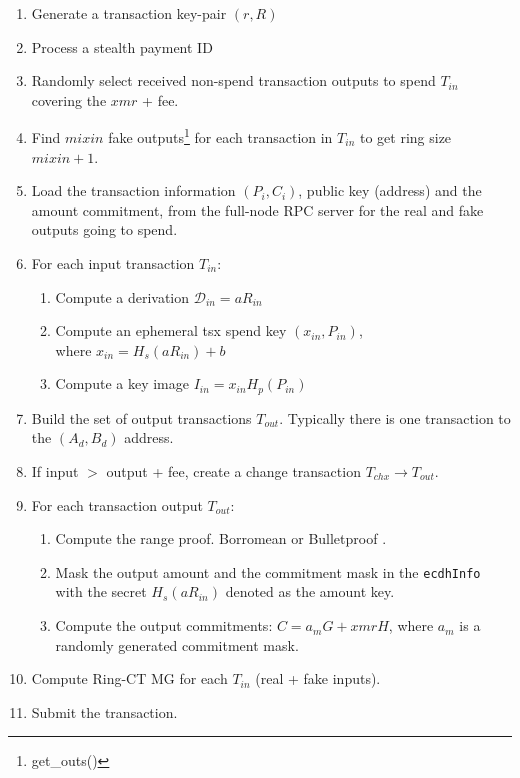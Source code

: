 \documentclass[]{article}
\begin{document}
\begin{enumerate}
	\item Generate a transaction key-pair $(r, R)$
	\item Process a stealth payment ID
	\item Randomly select received non-spend transaction outputs to spend $T_{in}$ covering the $xmr$ + fee.
	\item Find $mixin$ fake outputs\footnote{get\_outs()} for each transaction in $T_{in}$ to get ring size $mixin + 1$.
	\item Load the transaction information $(P_i, C_i)$, public key (address) and the amount commitment, from the full-node RPC server for the real and fake outputs going to spend.
	\item For each input transaction $T_{in}$:
	\begin{enumerate}
		\item Compute a derivation $\mathcal{D}_{in} = aR_{in}$
		\item Compute an ephemeral tsx spend key $(x_{in}, P_{in})$, \\where $x_{in} = H_s(aR_{in}) + b$
		\item Compute a key image $I_{in} = x_{in}H_p(P_{in})$
	\end{enumerate}
	\item Build the set of output transactions $T_{out}$. Typically there is one transaction to the $(A_d, B_d)$ address.
	\item If input $>$ output + fee, create a change transaction $T_{chx} \rightarrow T_{out}$. 
	\item For each transaction output $T_{out}$:
	\begin{enumerate}
		\item Compute the range proof. Borromean or Bulletproof \cite{monero_1098, borromean, Bnz2017BulletproofsSP}.
		\item Mask the output amount and the commitment mask in the \verb|ecdhInfo| with the secret $H_s(aR_{in})$ denoted as the amount key.
		\item Compute the output commitments: $C = a_mG + xmrH$, where $a_m$ is a randomly generated commitment mask.
	\end{enumerate}
	\item Compute Ring-CT MG for each $T_{in}$ (real + fake inputs).
	\item Submit the transaction.
\end{enumerate}
\end{document}
